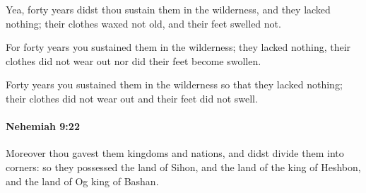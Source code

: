 			\begin{versebox}
					\item[BHS] 
					\item[LXX] 
					\item[ASV] Yea, forty years didst thou sustain them in the wilderness, and they lacked nothing; their clothes waxed not old, and their feet swelled not.
					\item[NIV] For forty years you sustained them in the wilderness; they lacked nothing, their clothes did not wear out nor did their feet become swollen.
					\item[NRSV] Forty years you sustained them in the wilderness so that they lacked nothing; their clothes did not wear out and their feet did not swell.
			\end{versebox}

		\paragraph{Nehemiah 9:22} %
			\label{NEHEMIAH-9-22}

			Moreover thou gavest them kingdoms and nations, and didst divide them into corners: so they possessed the land of Sihon, and the land of the king of Heshbon, and the land of Og king of Bashan.

